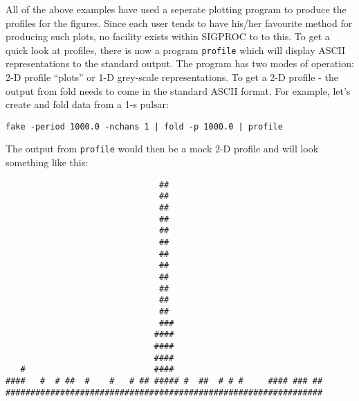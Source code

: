 \documentclass[11pt]{article}
\begin{document}
All of the above examples have used a seperate plotting program
to produce the profiles for the figures. Since each user tends
to have his/her favourite method for producing such plots, no
facility exists within SIGPROC to to this. To get a quick look
at profiles, there is now a program {\tt profile} which will
display ASCII representations to the standard output. The program
has two modes of operation: 2-D profile ``plots'' or 1-D grey-scale
representations. To get a 2-D profile - the output from fold needs
to come in the standard ASCII format. For example, let's create
and fold data from a 1-s pulsar:
\begin{verbatim}
fake -period 1000.0 -nchans 1 | fold -p 1000.0 | profile
\end{verbatim}
The output from {\tt profile} would then be a mock 2-D profile
and will look something like this:
\begin{verbatim}
                               ##                               
                               ##                               
                               ##                               
                               ##                               
                               ##                               
                               ##                               
                               ##                               
                               ##                               
                               ##                               
                               ##                               
                               ##                               
                               ##                               
                               ###                              
                              ####                              
                              ####                              
                              ####                              
   #                          ####                              
####   #  # ##  #    #   # ## ##### #  ##  # # #     #### ### ##
################################################################
\end{verbatim}
\end{document}
